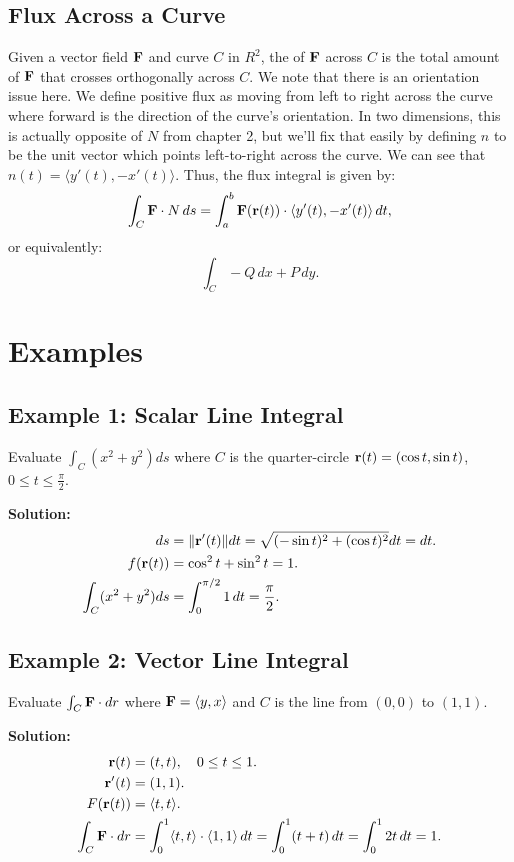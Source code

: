 \subsection{Flux Across a Curve}
Given a vector field \(\mathbf{F}\) and curve \(C\) in \(R^{2}\), the  of \(\mathbf{F}\) across \(C\) is the total amount of \(\mathbf{F}\) that crosses orthogonally across \(C\). We note that there is an orientation issue here. We define positive flux as moving from left to right across the curve where forward is the direction of the curve’s orientation. In two dimensions, this is actually opposite of \(N\) from chapter 2, but we’ll fix that easily by defining \(n\) to be the unit vector which points left-to-right across the curve. We can see that \(n(t) = \langle y'(t), -x'(t) \rangle\).
Thus, the flux integral is given by:
\[ \int_C \mathbf{F} \cdot N \, ds = \int_a^b \mathbf{F}(\mathbf{r}(t)) \cdot \langle y'(t), -x'(t) \rangle \, dt, \]
or equivalently:
\[ \int_C -Q \, dx + P \, dy. \]

\section{Examples}
\subsection{Example 1: Scalar Line Integral}
Evaluate \( \int_C (x^2 + y^2) ds \) where \( C \) is the quarter-circle \( \mathbf{r}(t) = (\cos t, \sin t) \), \( 0 \leq t \leq \frac{\pi}{2} \).

\textbf{Solution:}
\begin{align*}
    ds &= \|\mathbf{r}'(t)\| dt = \sqrt{(-\sin t)^2 + (\cos t)^2} dt = dt. \\
    f(\mathbf{r}(t)) &= \cos^2 t + \sin^2 t = 1. \\
    \int_C (x^2 + y^2) ds &= \int_0^{\pi/2} 1 \, dt = \frac{\pi}{2}.
\end{align*}

\subsection{Example 2: Vector Line Integral}
Evaluate \( \int_C \mathbf{F} \cdot dr \) where \( \mathbf{F} = \langle y, x \rangle \) and \( C \) is the line from \( (0,0) \) to \( (1,1) \).

\textbf{Solution:}
\begin{align*}
    \mathbf{r}(t) &= (t, t), \quad 0 \leq t \leq 1. \\
    \mathbf{r}'(t) &= (1,1). \\
    F(\mathbf{r}(t)) &= \langle t, t \rangle. \\
    \int_C \mathbf{F} \cdot dr &= \int_0^1 \langle t, t \rangle \cdot \langle 1, 1 \rangle \, dt = \int_0^1 (t + t) \, dt = \int_0^1 2t \, dt = 1.
\end{align*}